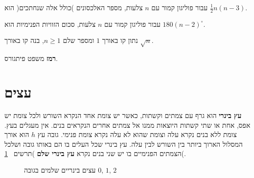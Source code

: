 \begin{exercise}\label{e.diag}
עבור פוליגון קמור עם
$n$
צלעות, מספר האלכסונים )כולל אלה שנחתכים( הוא
$\frac{1}{2}n(n-3)$.
\end{exercise}
\begin{exercise}
עבור פוליגון קמור עם
$n$
צלעות, סכום הזוויות הפנימיות הוא
$180(n-2)^{\circ}$.
\end{exercise}
\begin{exercise}
נתון קו באורך
$1$
ומספר שלם
$n\geq 1$,
בנה קו באורך
$\sqrt n$.
\end{exercise}
\textbf{רמז}
משפט פיתגורס.

\section{%
עצים%
}

\textbf{עץ בינרי}
הוא גרף עם צמתים וקשתות, כאשר יש צומת אחד הנקרא השורש ולכל צומת יש אפס, אחת או שתי קשתות היוצאות ממנו אל צמתים אחרים הנקראים בנים. אין מעגלים בעץ. צומת ללא בנים נקרא עלה וצומת שהוא לא עלה נקרא צומת פנימי. גובה עץ
$h$
הוא אורך המסלול הארוך ביותר בין השורש לבין עלה. עץ בינרי שכל העלים בו הם באותו גובה ושלכל הצמתים הפנימיים בו יש שני בנים נקרא
\textbf{עץ בינרי שלם}
)תרשים~%
\ref{fig.complete}(.

\begin{figure}[h]
\begin{center}
\caption{%
עצים בינריים שלמים בגובה
$0$, $1$, $2$
}\label{fig.complete}
\end{center}
\end{figure}

\vspace*{-6ex}

